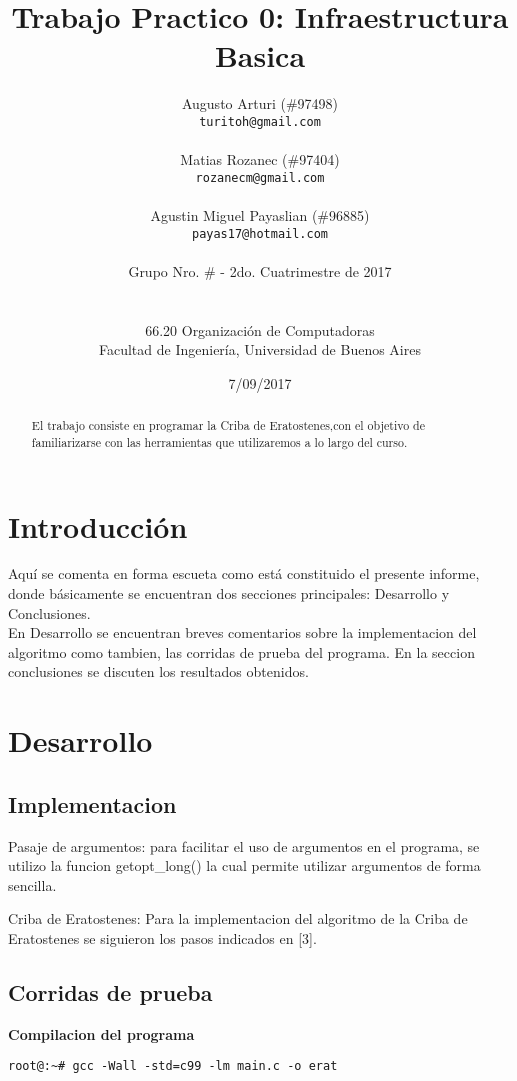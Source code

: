 \documentclass[a4paper,10pt]{article}
\title{\textbf{Trabajo Practico 0: Infraestructura Basica}}
\author{Augusto Arturi (\#97498)\\
\texttt{turitoh@gmail.com}\\
\\
Matias Rozanec (\#97404)\\            \texttt{rozanecm@gmail.com}\\
\\
Agustin Miguel Payaslian (\#96885)\\            \texttt{payas17@hotmail.com}\\
\\
\normalsize{Grupo Nro. \# - 2do. Cuatrimestre de 2017}\\
\\
\\
\normalsize{66.20 Organización de Computadoras}\\
\normalsize{Facultad de Ingeniería, Universidad de Buenos Aires}\\
}
\date{7/09/2017}
\begin{document}
\maketitle
\thispagestyle{empty}

\newpage
\begin{abstract}

El trabajo consiste en programar la Criba de Eratostenes,con el objetivo de familiarizarse con las herramientas que utilizaremos a lo largo del curso.
\end{abstract}


\section{Introducción}
Aquí se comenta en forma escueta como está constituido el presente informe, donde  básicamente  se  encuentran  dos  secciones  principales: Desarrollo y Conclusiones.\\
En Desarrollo se encuentran breves comentarios sobre la implementacion del algoritmo como tambien, las corridas de prueba del programa. En la seccion conclusiones se discuten los resultados obtenidos.

\section{Desarrollo}

\subsection{Implementacion}
Pasaje de argumentos: para facilitar el uso de argumentos en el programa, se utilizo la funcion getopt\_long() la cual permite utilizar argumentos de forma sencilla.

Criba de Eratostenes: Para la implementacion del algoritmo de la Criba de Eratostenes  se siguieron los pasos indicados en [3].
 
\subsection{Corridas de prueba}

\vspace{0.5cm}
\textbf{Compilacion del programa}
\lstset{language=bash, breaklines=true, , basicstyle=\footnotesize}
\begin{lstlisting}[frame = single]
root@:~# gcc -Wall -std=c99 -lm main.c -o erat
\end{lstlisting}
\end{document}

